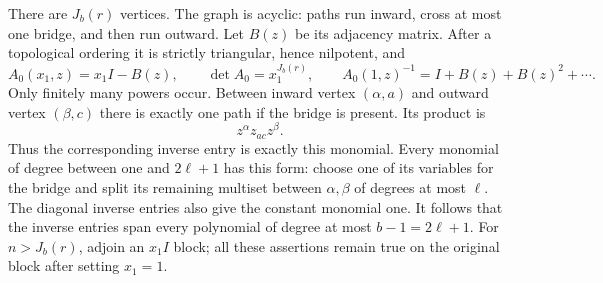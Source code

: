 There are \(J_b(r)\) vertices. The graph is acyclic:
paths run inward, cross at most one bridge, and then run
outward. Let \(B(z)\) be its adjacency matrix. After a
topological ordering it is strictly triangular, hence nilpotent,
and
\[
 A_0(x_1,z)=x_1 I-B(z),\qquad
 \det A_0=x_1^{J_b(r)},\qquad
 A_0(1,z)^{-1}=I+B(z)+B(z)^2+\cdots.
\]
Only finitely many powers occur. Between inward vertex
\((\alpha,a)\) and outward vertex \((\beta,c)\) there
is exactly one path if the bridge is present. Its product is
\[
                         z^\alpha z_{ac}z^\beta.
                                                               \tag{M-013.1}
\]
Thus the corresponding inverse entry is exactly this monomial.
Every monomial of degree between one and \(2\ell+1\)
has this form: choose one of its variables for the bridge
and split its remaining multiset between \(\alpha,\beta\)
of degrees at most \(\ell\). The diagonal inverse entries
also give the constant monomial one. It follows that the
inverse entries span every polynomial of degree at most
\(b-1=2\ell+1\). For \(n>J_b(r)\), adjoin an
\(x_1 I\) block; all these assertions remain true on the
original block after setting \(x_1=1\).

